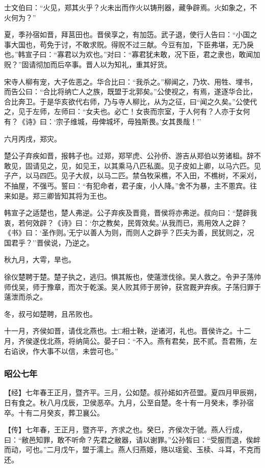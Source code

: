 \documentclass[]{article}
\begin{document}
士文伯曰：``火见，郑其火乎？火未出而作火以铸刑器，藏争辟焉。火如象之，不火何为？''

夏，季孙宿如晋，拜莒田也。晋侯享之，有加笾。武子退，使行人告曰：``小国之事大国也，苟免于讨，不敢求贶。得贶不过三献。今豆有加，下臣弗堪，无乃戾也。''韩宣子曰：``寡君以为欢也。''对曰：``寡君犹未敢，况下臣，君之隶也，敢闻加贶？''固请彻加而后卒事。晋人以为知礼，重其好货。

宋寺人柳有宠，大子佐恶之。华合比曰：``我杀之。''柳闻之，乃坎、用牲、埋书，而告公曰：``合比将纳亡人之族，既盟于北郭矣。''公使视之，有焉，遂逐华合比，合比奔卫。于是华亥欲代右师，乃与寺人柳比，从为之征，曰``闻之久矣。''公使代之，见于左师，左师曰：``女夫也。必亡！女丧而宗室，于人何有？人亦于女何有？《诗》曰：`宗子维城，毋俾城坏，毋独斯畏。'女其畏哉！''

六月丙戌，郑灾。

楚公子弃疾如晋，报韩子也。过郑，郑罕虎、公孙侨、游吉从郑伯以劳诸柤。辞不敢见，固请见之，见，如见王，以其乘马八匹私面。见子皮如上卿，以马六匹。见子产，以马四匹。见子大叔，以马二匹。禁刍牧采樵，不入田，不樵树，不采刈，不抽屋，不强丐。誓曰：``有犯命者，君子废，小人降。''舍不为暴，主不慁宾。往来如是。郑三卿皆知其将为王也。

韩宣子之适楚也，楚人弗逆。公子弃疾及晋竟，晋侯将亦弗逆。叔向曰：``楚辟我衷，若何效辟？《诗》曰：`尔之教矣，民胥效矣。'从我而已，焉用效人之辟？《书》曰：`圣作则。'无宁以善人为则，而则人之辟乎？匹夫为善，民犹则之，况国君乎？''晋侯说，乃逆之。

秋九月，大雩，旱也。

徐仪楚聘于楚。楚子执之，逃归。惧其叛也，使薳泄伐徐。吴人救之。令尹子荡帅师伐吴，师于豫章，而次于乾溪。吴人败其师于房钟，获宫厩尹弃疾。子荡归罪于薳泄而杀之。

冬，叔弓如楚聘，且吊败也。

十一月，齐侯如晋，请伐北燕也。士□相士鞅，逆诸河，礼也。晋侯许之。十二月，齐侯遂伐北燕，将纳简公。晏子曰：``不入。燕有君矣，民不贰。吾君贿，左右谄谀，作大事不以信，未尝可也。''

\hypertarget{header-n2480}{%
\subsubsection{昭公七年}\label{header-n2480}}

【经】七年春王正月，暨齐平。三月，公如楚。叔孙婼如齐莅盟。夏四月甲辰朔，日有食之。秋八月戊辰，卫侯恶卒。九月，公至自楚。冬十有一月癸未，季孙宿卒。十有二月癸亥，葬卫襄公。

【传】七年春，王正月，暨齐平，齐求之也。癸巳，齐侯次于虢。燕人行成，曰：``敝邑知罪，敢不听命？先君之敝器，请以谢罪。''公孙皙曰：``受服而退，俟衅而动，可也。''二月戊午，盟于濡上。燕人归燕姬，赂以瑶瓮、玉椟、斗耳，不克而还。
\end{document}
